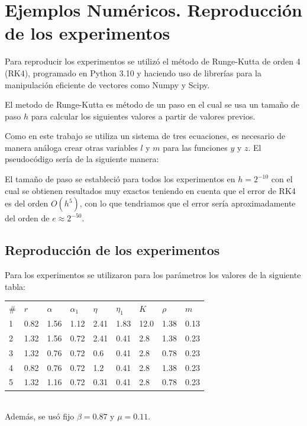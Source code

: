 \documentclass[12pt, a4paper]{article}
\begin{document}
\section*{Ejemplos Numéricos. Reproducción de los experimentos}

Para reproducir los experimentos se utilizó el método de Runge-Kutta de orden 4 (RK4), programado
en Python 3.10 y haciendo uso de librerías para la manipulación eficiente de vectores como Numpy y 
Scipy.

El metodo de Runge-Kutta es método de un paso en el cual se usa un tamaño de paso $h$ para calcular 
los siguientes valores a partir de valores previos.

Como en este trabajo se utiliza un sistema de tres ecuaciones, 
es necesario de manera análoga crear otras variables $l$ y $m$ para
las funciones $y$ y $z$. El pseudocódigo sería de la siguiente manera:



El tamaño de paso se estableció para todos los experimentos en 
$h=2^{-10}$ con el cual se obtienen resultados muy exactos teniendo
en cuenta que el error de RK4 es del orden $O(h^5)$, con lo que tendriamos
que el error sería aproximadamente del orden de $e \approx 2^{-50}$.

\subsection*{Reproducción de los experimentos}

Para los experimentos se utilizaron para los parámetros los valores de la siguiente tabla:

\begin{tabular}{p{1cm} | p{1cm} | p{1cm} | p{1cm} | p{1cm} | p{1cm} | p{1cm} | p{1cm} | p{1cm} }
    $\#$ & $r$ & $\alpha$ & $\alpha_1$ & $\eta$ & $\eta_1$ & $K$ & $\rho$ & $m$\\
    1 & 0.82 & 1.56 & 1.12 & 2.41 & 1.83 & 12.0 & 1.38 & 0.13\\
    2 & 1.32 & 1.56 & 0.72 & 2.41 & 0.41 & 2.8 & 1.38 & 0.23\\
    3 & 1.32 & 0.76 & 0.72 & 0.6 & 0.41 & 2.8 & 0.78 & 0.23\\
    4 & 0.82 & 0.76 & 0.72 & 1.2 & 0.41 & 2.8 & 1.38 & 0.23\\
    5 & 1.32 & 1.16 & 0.72 & 0.31 & 0.41 & 2.8 & 0.78 & 0.23\\
\end{tabular}
\\
Además, se usó fijo $\beta=0.87$ y $\mu=0.11$.
\end{document}
